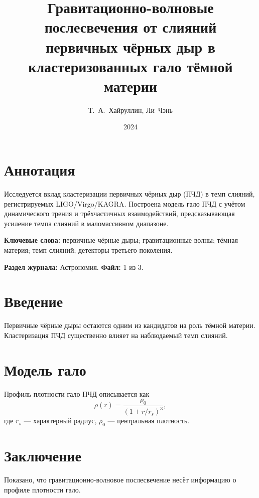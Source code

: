\documentclass[12pt]{article}
\title{Гравитационно-волновые послесвечения от слияний\\ первичных чёрных дыр в кластеризованных гало тёмной материи}
\author{Т.~А.~Хайруллин, Ли~Чэнь}
\date{2024}
\begin{document}
\maketitle

\section*{Аннотация}
Исследуется вклад кластеризации первичных чёрных дыр (ПЧД) в темп слияний, регистрируемых LIGO/Virgo/KAGRA. Построена модель гало ПЧД с учётом динамического трения и трёхчастичных взаимодействий, предсказывающая усиление темпа слияний в маломассивном диапазоне.

\vspace{0.5cm}
\noindent\textbf{Ключевые слова:} первичные чёрные дыры; гравитационные волны; тёмная материя; темп слияний; детекторы третьего поколения.

\vspace{0.3cm}
\noindent\textbf{Раздел журнала:} Астрономия. \quad \textbf{Файл:} 1 из 3.

\section{Введение}
Первичные чёрные дыры остаются одним из кандидатов на роль тёмной материи. Кластеризация ПЧД существенно влияет на наблюдаемый темп слияний.

\section{Модель гало}
Профиль плотности гало ПЧД описывается как
\begin{equation}
\rho(r) = \frac{\rho_0}{\left(1 + r/r_s\right)^{3}},
\end{equation}
где $r_s$ — характерный радиус, $\rho_0$ — центральная плотность.

\section{Заключение}
Показано, что гравитационно-волновое послесвечение несёт информацию о профиле плотности гало.
\end{document}
